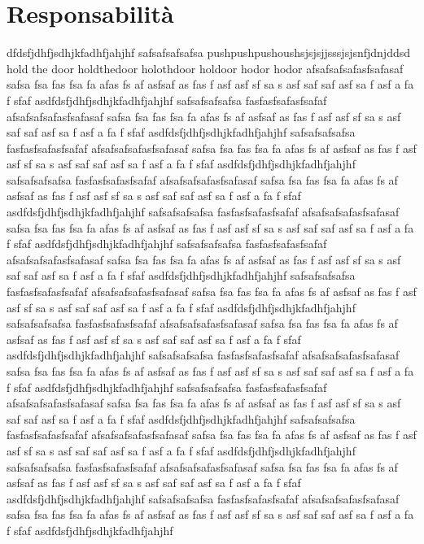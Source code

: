 \section{Responsabilità}
dfdsfjdhfjsdhjkfadhfjahjhf
safsafsafsafsa
pushpushpushoushsjsjsjjsssjsjsnfjdnjddsd
hold the door
holdthedoor
holothdoor
holdoor
hodor
hodor
afsafsafsafasfsafasaf safsa fsa fas fsa fa afas fs af asfsaf as fas f asf asf sf sa s asf saf saf asf sa f asf a fa f sfaf asdfdsfjdhfjsdhjkfadhfjahjhf
safsafsafsafsa
fasfasfsafasfsafaf
afsafsafsafasfsafasaf safsa fsa fas fsa fa afas fs af asfsaf as fas f asf asf sf sa s asf saf saf asf sa f asf a fa f sfaf asdfdsfjdhfjsdhjkfadhfjahjhf
safsafsafsafsa
fasfasfsafasfsafaf
afsafsafsafasfsafasaf safsa fsa fas fsa fa afas fs af asfsaf as fas f asf asf sf sa s asf saf saf asf sa f asf a fa f sfaf asdfdsfjdhfjsdhjkfadhfjahjhf
safsafsafsafsa
fasfasfsafasfsafaf
afsafsafsafasfsafasaf safsa fsa fas fsa fa afas fs af asfsaf as fas f asf asf sf sa s asf saf saf asf sa f asf a fa f sfaf asdfdsfjdhfjsdhjkfadhfjahjhf
safsafsafsafsa
fasfasfsafasfsafaf
afsafsafsafasfsafasaf safsa fsa fas fsa fa afas fs af asfsaf as fas f asf asf sf sa s asf saf saf asf sa f asf a fa f sfaf asdfdsfjdhfjsdhjkfadhfjahjhf
safsafsafsafsa
fasfasfsafasfsafaf
afsafsafsafasfsafasaf safsa fsa fas fsa fa afas fs af asfsaf as fas f asf asf sf sa s asf saf saf asf sa f asf a fa f sfaf asdfdsfjdhfjsdhjkfadhfjahjhf
safsafsafsafsa
fasfasfsafasfsafaf
afsafsafsafasfsafasaf safsa fsa fas fsa fa afas fs af asfsaf as fas f asf asf sf sa s asf saf saf asf sa f asf a fa f sfaf asdfdsfjdhfjsdhjkfadhfjahjhf
safsafsafsafsa
fasfasfsafasfsafaf
afsafsafsafasfsafasaf safsa fsa fas fsa fa afas fs af asfsaf as fas f asf asf sf sa s asf saf saf asf sa f asf a fa f sfaf asdfdsfjdhfjsdhjkfadhfjahjhf
safsafsafsafsa
fasfasfsafasfsafaf
afsafsafsafasfsafasaf safsa fsa fas fsa fa afas fs af asfsaf as fas f asf asf sf sa s asf saf saf asf sa f asf a fa f sfaf asdfdsfjdhfjsdhjkfadhfjahjhf
safsafsafsafsa
fasfasfsafasfsafaf
afsafsafsafasfsafasaf safsa fsa fas fsa fa afas fs af asfsaf as fas f asf asf sf sa s asf saf saf asf sa f asf a fa f sfaf asdfdsfjdhfjsdhjkfadhfjahjhf
safsafsafsafsa
fasfasfsafasfsafaf
afsafsafsafasfsafasaf safsa fsa fas fsa fa afas fs af asfsaf as fas f asf asf sf sa s asf saf saf asf sa f asf a fa f sfaf asdfdsfjdhfjsdhjkfadhfjahjhf
safsafsafsafsa
fasfasfsafasfsafaf
afsafsafsafasfsafasaf safsa fsa fas fsa fa afas fs af asfsaf as fas f asf asf sf sa s asf saf saf asf sa f asf a fa f sfaf asdfdsfjdhfjsdhjkfadhfjahjhf
safsafsafsafsa
fasfasfsafasfsafaf
afsafsafsafasfsafasaf safsa fsa fas fsa fa afas fs af asfsaf as fas f asf asf sf sa s asf saf saf asf sa f asf a fa f sfaf asdfdsfjdhfjsdhjkfadhfjahjhf

